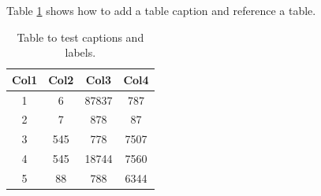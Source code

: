 \documentclass{article}
\begin{document}
	\begin{center}
		Table \ref{table:data} shows how to add a table caption and reference a table.
		\begin{table}[h!]
			\centering
			
			\begin{tabular}{|| c  c  c c ||}
				\hline
				Col1 & Col2 & Col3 & Col4 \\
				\hline \hline
				1 & 6 & 87837 & 787 \\
				\hline
				2 & 7 & 878 & 87 \\
				\hline
				3 & 545 & 778 & 7507 \\
				\hline
				4 & 545 & 18744 & 7560 \\
				\hline
				5 & 88 & 788 & 6344 \\
				\hline
			\end{tabular}
			
			\caption{Table to test captions and labels.}
			\label{table:data}
		\end{table}
		
	\end{center}
\end{document}

